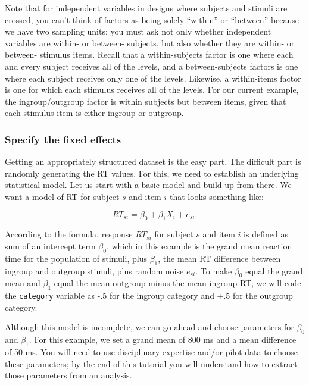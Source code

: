 \documentclass[doc,floatsintext]{apa6}
\begin{document}
Note that for independent variables in designs where subjects and stimuli are crossed, you can't think of factors as being solely \enquote{within} or \enquote{between} because we have two sampling units; you must ask not only whether independent variables are within- or between- subjects, but also whether they are within- or between- stimulus items. Recall that a within-subjects factor is one where each and every subject receives all of the levels, and a between-subjects factors is one where each subject receives only one of the levels. Likewise, a within-items factor is one for which each stimulus receives all of the levels. For our current example, the ingroup/outgroup factor is within subjects but between items, given that each stimulus item is either ingroup or outgroup.

\hypertarget{specify-the-fixed-effects}{%
\subsubsection{Specify the fixed effects}\label{specify-the-fixed-effects}}

Getting an appropriately structured dataset is the easy part. The difficult part is randomly generating the RT values. For this, we need to establish an underlying statistical model. Let us start with a basic model and build up from there. We want a model of RT for subject \(s\) and item \(i\) that looks something like:

\begin{equation}
RT_{si} = \beta_0 + \beta_1 X_{i} + e_{si}.
\end{equation}

\noindent According to the formula, response \(RT_{si}\) for subject \(s\) and item \(i\) is defined as sum of an intercept term \(\beta_0\), which in this example is the grand mean reaction time for the population of stimuli, plus \(\beta_1\), the mean RT difference between ingroup and outgroup stimuli, plus random noise \(e_{si}\). To make \(\beta_0\) equal the grand mean and \(\beta_1\) equal the mean outgroup minus the mean ingroup RT, we will code the \texttt{category} variable as -.5 for the ingroup category and +.5 for the outgroup category.

Although this model is incomplete, we can go ahead and choose parameters for \(\beta_0\) and \(\beta_1\). For this example, we set a grand mean of 800 ms and a mean difference of 50 ms. You will need to use disciplinary expertise and/or pilot data to choose these parameters; by the end of this tutorial you will understand how to extract those parameters from an analysis.
\end{document}
